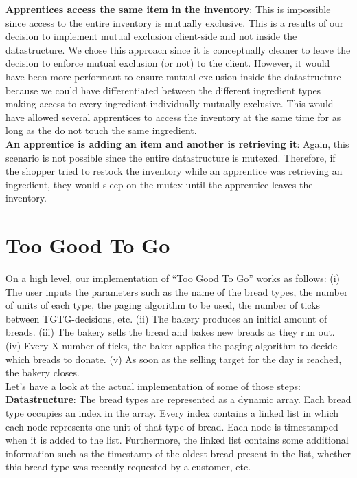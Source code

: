 \documentclass[11pt]{article}
\begin{document}
\textbf{Apprentices access the same item in the inventory}: This is impossible since access to the entire inventory is mutually exclusive. This is a results of our decision to implement mutual exclusion client-side and not inside the datastructure. We chose this approach since it is conceptually cleaner to leave the decision to enforce mutual exclusion (or not) to the client. However, it would have been more performant to ensure mutual exclusion inside the datastructure because we could have differentiated between the different ingredient types making access to every ingredient individually mutually exclusive. This would have allowed several apprentices to access the inventory at the same time for as long as the do not touch the same ingredient.\\

\textbf{An apprentice is adding an item and another is retrieving it}: Again, this scenario is not possible since the entire datastructure is mutexed. Therefore, if the shopper tried to restock the inventory while an apprentice was retrieving an ingredient, they would sleep on the mutex until the apprentice leaves the inventory.\\

\section{Too Good To Go}
\label{sec:org221217c}

On a high level, our implementation of ``Too Good To Go'' works as follows: (i) The user inputs the parameters such as the name of the bread types, the number of units of each type, the paging algorithm to be used, the number of ticks between TGTG-decisions, etc. (ii) The bakery produces an initial amount of breads. (iii) The bakery sells the bread and bakes new breads as they run out. (iv) Every X number of ticks, the baker applies the paging algorithm to decide which breads to donate. (v) As soon as the selling target for the day is reached, the bakery closes.\\

Let's have a look at the actual implementation of some of those steps:\\

\textbf{Datastructure}: The bread types are represented as a dynamic array. Each bread type occupies an index in the array. Every index contains a linked list in which each node represents one unit of that type of bread. Each node is timestamped when it is added to the list. Furthermore, the linked list contains some additional information such as the timestamp of the oldest bread present in the list, whether this bread type was recently requested by a customer, etc.\\
\end{document}
